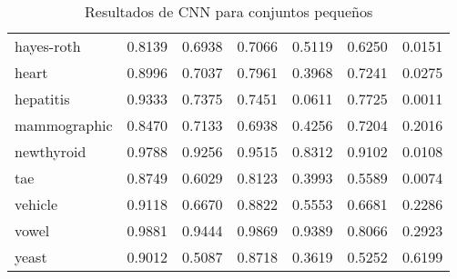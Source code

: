 \begin{table}[]
\begin{tabular}{l c c c c c c}
hayes-roth & 0.8139 & 0.6938 & 0.7066 & 0.5119 & 0.6250 & 0.0151 \\
heart & 0.8996 & 0.7037 & 0.7961 & 0.3968 & 0.7241 & 0.0275 \\
hepatitis & 0.9333 & 0.7375 & 0.7451 & 0.0611 & 0.7725 & 0.0011 \\
mammographic & 0.8470 & 0.7133 & 0.6938 & 0.4256 & 0.7204 & 0.2016 \\
newthyroid & 0.9788 & 0.9256 & 0.9515 & 0.8312 & 0.9102 & 0.0108 \\
tae & 0.8749 & 0.6029 & 0.8123 & 0.3993 & 0.5589 & 0.0074 \\
vehicle & 0.9118 & 0.6670 & 0.8822 & 0.5553 & 0.6681 & 0.2286 \\
vowel & 0.9881 & 0.9444 & 0.9869 & 0.9389 & 0.8066 & 0.2923 \\
yeast & 0.9012 & 0.5087 & 0.8718 & 0.3619 & 0.5252 & 0.6199 \\

\hline
\end{tabular}
\caption{Resultados de CNN para conjuntos pequeños }
\label{res-peq-cnn}
\end{table}

